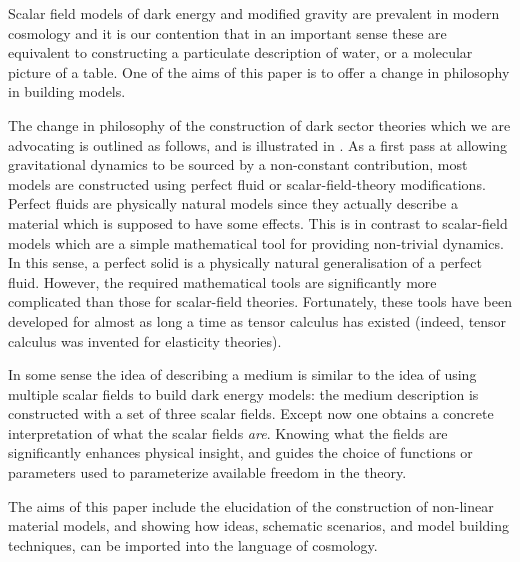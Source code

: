 Scalar field models of dark energy and modified gravity are prevalent in modern cosmology and it is our contention that in an important sense these are equivalent to constructing a particulate description of water, or a molecular picture of a table. One of the aims of this paper is to offer a change in philosophy in building models.

The change in philosophy of the construction of dark sector theories  which we are advocating is outlined as follows, and is illustrated in . As a first pass at allowing gravitational dynamics to be sourced by a non-constant contribution, most models are constructed using perfect fluid or scalar-field-theory modifications. Perfect fluids are physically natural models since they actually     describe a material which is supposed to have some effects. This is in contrast to scalar-field models which are a simple mathematical tool for providing non-trivial dynamics. In this sense, a perfect solid is a physically natural generalisation of a perfect fluid. However, the required mathematical tools are significantly more complicated than those for scalar-field theories. Fortunately, these tools have been developed for almost as long a time as tensor calculus has existed (indeed, tensor calculus was invented for elasticity theories).



In some sense the idea of describing a medium is similar to the idea of using multiple scalar fields to build dark energy models: the medium description is constructed with a set of three scalar fields. Except now one obtains a concrete interpretation of what the scalar fields \textit{are}. Knowing what the fields are significantly enhances physical insight, and guides the choice of  functions or parameters used to parameterize available freedom in the theory.


The aims of this paper include the elucidation of the construction of non-linear material models, and  showing how ideas, schematic scenarios, and model building techniques, can be imported into the language of cosmology.




